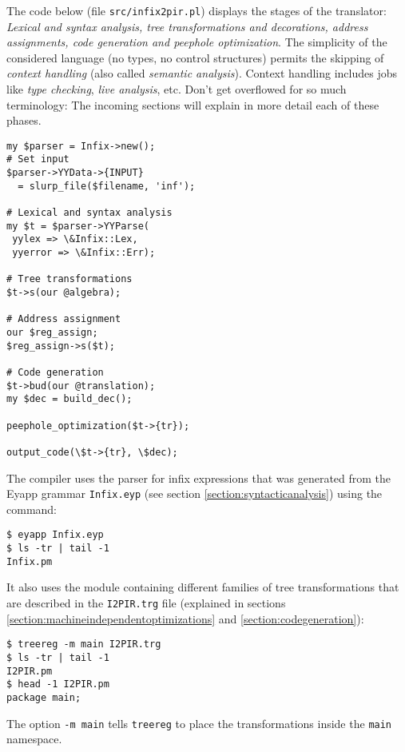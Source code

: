 The code below 
(file \verb|src/infix2pir.pl|) %
displays
the stages of the translator: \emph{Lexical
and syntax analysis, tree transformations
and decorations,
address assignments, code generation
and peephole optimization}. The simplicity of the 
considered language (no types, no control structures) 
permits the skipping of 
\emph{context handling} (also called \emph{semantic analysis}).
Context handling includes jobs like \emph{type checking}, 
\emph{live analysis}, etc.
Don't get overflowed for so much terminology:
The incoming sections will
explain in more detail each of these phases.
\begin{verbatim}
my $parser = Infix->new();
# Set input 
$parser->YYData->{INPUT} 
  = slurp_file($filename, 'inf');

# Lexical and syntax analysis
my $t = $parser->YYParse(
 yylex => \&Infix::Lex, 
 yyerror => \&Infix::Err);

# Tree transformations
$t->s(our @algebra);

# Address assignment
our $reg_assign;
$reg_assign->s($t);

# Code generation
$t->bud(our @translation);
my $dec = build_dec();

peephole_optimization($t->{tr});

output_code(\$t->{tr}, \$dec);
\end{verbatim}

The compiler uses the parser for infix expressions
that was generated from the Eyapp grammar  \verb|Infix.eyp|
(see section \ref{section:syntacticanalysis})
using the command:
\begin{verbatim}
$ eyapp Infix.eyp
$ ls -tr | tail -1
Infix.pm
\end{verbatim}
It also uses the module containing different families of tree
transformations that are described in the \verb|I2PIR.trg| file 
(explained in 
sections \ref{section:machineindependentoptimizations} and \ref{section:codegeneration}): 
\begin{verbatim}
$ treereg -m main I2PIR.trg
$ ls -tr | tail -1
I2PIR.pm
$ head -1 I2PIR.pm
package main;
\end{verbatim}
The option \verb|-m main| tells \verb|treereg|
to place the transformations inside the \verb|main|
namespace. 
